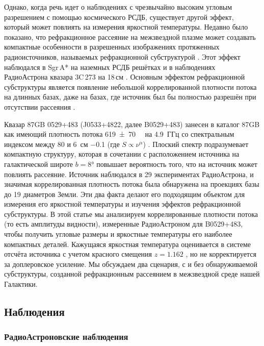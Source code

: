 Однако, когда речь идет о наблюдениях с чрезвычайно высоким угловым разрешением с помощью
космического РСДБ, существует другой эффект, который может повлиять на измерения яркостной
температуры. Недавно было показано, что рефракционное рассеяние на межзвездной плазме может
создавать компактные особенности в разрешенных изображениях протяженных радиоисточников, называемых
рефракционной субструктурой \cite{Johnson_2015}. Этот эффект наблюдался в Sgr\,A* на наземных РСДБ
решётках \cite{Gwinn_2014} и в наблюдениях РадиоАстрона квазара 3C\,273 на 18\,см
\cite{Johnson_2016}. Основным эффектом рефракционной субструктуры является появление небольшой
коррелированной плотности потока на длинных базах, даже на базах, где источник был бы полностью
разрешён при отсутствии рассеяния \cite{Johnson_2015}.

Квазар 87GB 0529+483 (J0533+4822, далее B0529+483) занесен в каталог 87GB как имеющий
плотность потока \SI{619+-70}{\milli\jansky} на 4.9~ГГц со спектральным индексом между 80 и 6~см
\num{-0.1} (где $S \propto \nu^\alpha$) \cite{Gregory_Condon_1991,Becker_1991}. Плоский спектр
подразумевает компактную структуру, которая в сочетании с расположением источника на галактической
широте $b = \ang{+8}$ повышает вероятность того, что на источник может повлиять рассеяние. Источник
наблюдался в 29 экспериментах РадиоАстрона, и значимая коррелированная плотность потока была
обнаружена на проекциях базы до 19 диаметров Земли. Эти два факта делают его подходящим
объектом для измерения его яркостной температуры и изучения эффектов рефракционной субструктуры. В
этой статье мы анализируем коррелированные плотности потока (то есть амплитуды видности),
измеренные РадиоАстроном для B0529+483, чтобы получить угловые размеры и яркостные температуры
его наиболее компактных деталей. Кажущаяся яркостная температура оценивается в
системе отсчёта источника с учетом красного смещения $z = 1.162$ \cite{Halpern_2003}, но не
корректируется за доплеровское усиление. Мы обсуждаем два сценария, с и без обнаруживаемой
субструктуры, созданной рефракционным рассеянием в межзвездной среде нашей Галактики.

\subsection{Наблюдения}

\subsubsection{РадиоАстроновские наблюдения}

